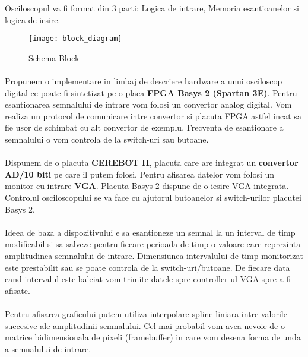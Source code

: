 Osciloscopul va fi format din 3 parti: Logica de intrare, Memoria esantioanelor si logica de iesire.

\begin{figure}[h]
\centering
\texttt{[image: block\_diagram]}
\caption{Schema Block}
\label{fig:block_diagram}
\end{figure}

\paragraph{}
Propunem o implementare in limbaj de descriere hardware a unui osciloscop digital ce poate fi sintetizat pe o placa \textbf{FPGA Basys 2 (Spartan 3E)}. Pentru esantionarea semnalului de intrare vom folosi un convertor analog digital. Vom realiza un protocol de comunicare intre convertor si placuta FPGA astfel incat sa fie usor de schimbat cu alt convertor de exemplu. Frecventa de esantionare a semnalului o vom controla de la switch-uri sau butoane. 
\paragraph{}
Dispunem de o placuta \textbf{CEREBOT II}, placuta care are integrat un  \textbf{convertor AD/10 biti} pe care il putem folosi. Pentru afisarea datelor vom folosi un monitor cu intrare \textbf{VGA}. Placuta Basys 2 dispune de o iesire VGA integrata. Controlul osciloscopului se va face cu ajutorul butoanelor si switch-urilor placutei Basys 2.
\paragraph{}
Ideea de baza a dispozitivului e sa esantioneze un semnal la un interval de timp modificabil si sa salveze pentru fiecare perioada de timp o valoare care reprezinta amplitudinea semnalului de intrare. Dimensiunea intervalului de timp monitorizat este prestabilit sau se poate controla de la switch-uri/butoane. De fiecare data cand intervalul este baleiat vom trimite datele spre controller-ul VGA spre a fi afisate. 
\paragraph{}
Pentru afisarea graficului putem utiliza interpolare spline liniara intre valorile succesive ale amplitudinii semnalului. Cel mai probabil vom avea nevoie de o matrice bidimensionala de pixeli (framebuffer) in care vom desena forma de unda a semnalului de intrare.